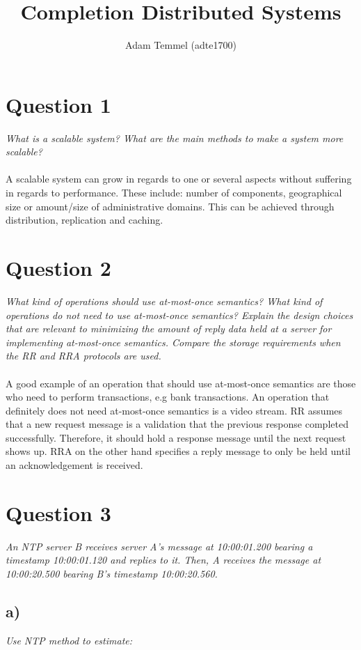 \documentclass[a4paper, titlepage,12pt]{article}
\title{Completion Distributed Systems}
\author{Adam Temmel (adte1700)}
\begin{document}
	\maketitle

	\section*{Question 1}
	\emph{What is a scalable system? What are the main methods to make a system more scalable?}
\\\\
	A scalable system can grow in regards to one or several aspects without suffering in regards to performance. These include: number of components, geographical size or amount/size of administrative domains. This can be achieved through distribution, replication and caching.

	\section*{Question 2}
	\emph{What kind of operations should use at-most-once semantics? What kind of operations do not need to use at-most-once semantics? Explain the design choices that are relevant to minimizing the amount of reply data held at a server for implementing at-most-once semantics. Compare the storage requirements when the RR and RRA protocols are used.}
\\\\
	A good example of an operation that should use at-most-once semantics are those who need to perform transactions, e.g bank transactions. An operation that definitely does not need at-most-once semantics is a video stream. RR assumes that a new request message is a validation that the previous response completed successfully. Therefore, it should hold a response message until the next request shows up. RRA on the other hand specifies a reply message to only be held until an acknowledgement is received.

	\section*{Question 3}
	\emph{An NTP server B receives server A's message at 10:00:01.200 bearing a timestamp 10:00:01.120 and replies to it. Then, A receives the message at 10:00:20.500 bearing B's timestamp 10:00:20.560.}
	\subsection*{a)}
	\emph{Use NTP method to estimate:}
\end{document}
